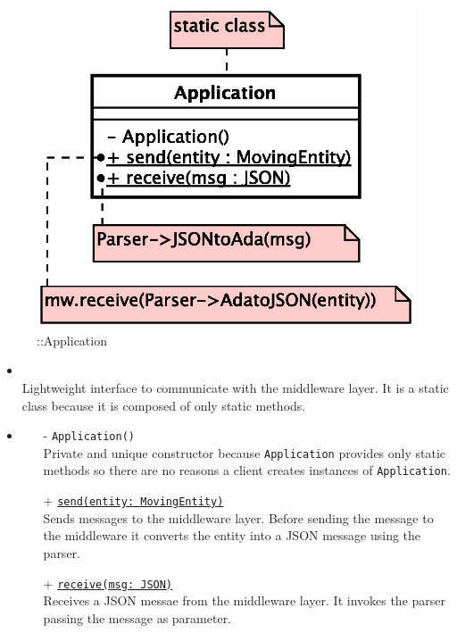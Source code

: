 \begin{figure}[h]
\centering
\includegraphics[scale=0.6,keepaspectratio]{images/solution/application.eps}
\caption{\pInterface::Application}
\label{fig:sd-app-application}
\end{figure}
\FloatBarrier
\begin{itemize}
  \item \textbf{\descr} \\
    Lightweight interface to communicate with the middleware layer.
    It is a static class because it is composed of only static methods.
  \item \textbf{\ops}
  \begin{itemize}
   \item[-] \texttt{Application()} \\
   Private and unique constructor because \texttt{Application} provides 
   only static methods so there are no reasons a client creates instances 
   of \texttt{Application}.
    \item[+] \texttt{\underline{send(entity: MovingEntity)}} \\
    Sends messages to the middleware layer. Before sending the message to the
    middleware it converts the entity into a JSON message using the parser.
    \item[+] \texttt{\underline{receive(msg: JSON)}} \\
    Receives a JSON messae from the middleware layer. It invokes the parser 
    passing the message as parameter.
  \end{itemize}
\end{itemize}
